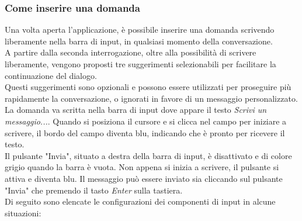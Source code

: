 \subsubsection{Come inserire una domanda}  
\label{subsec:come_inserire_domanda}  

Una volta aperta l'applicazione, è possibile inserire una domanda scrivendo liberamente nella barra di input, in qualsiasi momento della conversazione.\\
A partire dalla seconda interrogazione, oltre alla possibilità di scrivere liberamente, vengono proposti tre suggerimenti selezionabili per facilitare la continuazione del dialogo.\\
Questi suggerimenti sono opzionali e possono essere utilizzati per proseguire più rapidamente la conversazione, o ignorati in favore di un messaggio personalizzato.\\
La domanda va scritta nella barra di input dove appare il testo \textit{Scrivi un messaggio...}. Quando si posiziona il cursore e si clicca nel campo per iniziare a scrivere, il bordo del campo diventa blu, indicando che è pronto per ricevere il testo.\\
Il pulsante "Invia", situato a destra della barra di input, è disattivato e di colore grigio quando la barra è vuota. Non appena si inizia a scrivere, il pulsante si attiva e diventa blu.
Il messaggio può essere inviato sia cliccando sul pulsante "Invia" che premendo il tasto \textit{Enter} sulla tastiera.\\
Di seguito sono elencate le configurazioni dei componenti di input in alcune situazioni:

